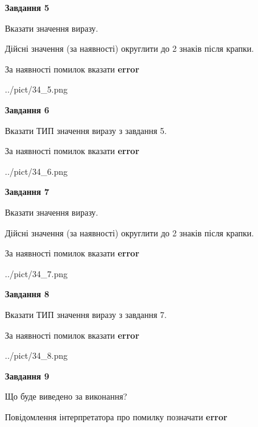 \documentclass[11pt, ukrainian]{article}
\begin{document}
{\begin {large}
{\begin {center}\textbf{Завдання 5}\end {center}}\par
Вказати значення виразу. \par
Дійсні значення (за наявності) округлити до 2 знаків після крапки. \par
За наявності помилок вказати \textbf{error}

\begin{center}
	{../pict/34_5.png}
\end{center}
\newpage

{\begin {center}\textbf{Завдання 6}\end {center}}\par
Вказати ТИП значення виразу з завдання 5. \par
За наявності помилок вказати \textbf{error}

\begin{center}
	{../pict/34_6.png}
\end{center}
\newpage

{\begin {center}\textbf{Завдання 7}\end {center}}\par
Вказати значення виразу. \par
Дійсні значення (за наявності) округлити до 2 знаків після крапки. \par
За наявності помилок вказати \textbf{error}

\begin{center}
	{../pict/34_7.png}
\end{center}
\newpage

{\begin {center}\textbf{Завдання 8}\end {center}}\par
Вказати ТИП значення виразу з завдання 7. \par
За наявності помилок вказати \textbf{error}

\begin{center}
	{../pict/34_8.png}
\end{center}
\newpage

{\begin {center}\textbf{Завдання 9}\end {center}}\par
Що буде виведено за виконання? \par
Повідомлення інтерпретатора про помилку позначати \textbf{error}


\end{large}}
\end{document}
